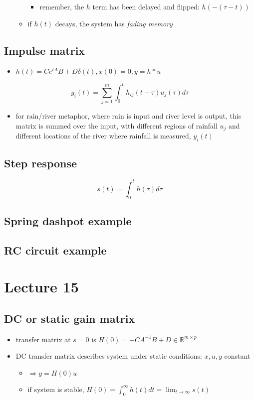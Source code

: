 \documentclass[10pt,letterpaper]{article}
\begin{document}
\begin{itemize}
\begin{itemize}
\begin{itemize}
\item remember, the $h$ term has been delayed and flipped: $h(-(\tau-t))$
\end{itemize}

\item if $h(t)$ decays, the system has \emph{fading memory}
\end{itemize}

\end{itemize}
\subsection{Impulse matrix}
\label{sec-12_6}

\begin{itemize}
\item $h(t) = C e ^{tA} B+D \delta(t), x(0)=0,y=h*u$
\end{itemize}
$$
y_i(t) = \sum ^{m} _{j=1} \int ^{t} _{0} h _{ij} (t-\tau) u _{j} (\tau) d\tau
$$ 
\begin{itemize}
\item for rain/river metaphor, where rain is input and river level is output, this matrix is summed over the input, with different regions of rainfall $u_j$ and different locations of the river where rainfall is measured, $y_i(t)$
\end{itemize}
\subsection{Step response}
\label{sec-12_7}

$$
s(t) = \int ^{t} _{0} h(\tau) d\tau
$$ 
\subsection{Spring dashpot example}
\label{sec-12_8}
\subsection{RC circuit example}
\label{sec-12_9}
\section{Lecture 15}
\label{sec-13}
\subsection{DC or static gain matrix}
\label{sec-13_1}

\begin{itemize}
\item transfer matrix at $s=0$ is $H(0)= -CA ^{-1} B + D \in \mathbb{R}^{m \times p}$
\item DC transfer matrix describes system under static conditions: $x,u,y$ constant

\begin{itemize}
\item $\Rightarrow y=H(0)u$
\item if system is stable, $\displaystyle H(0)= \int ^{\infty} _{0} h(t) dt= \lim_{t\rightarrow \infty} s(t)$
\end{itemize}

\end{itemize}
\end{document}
